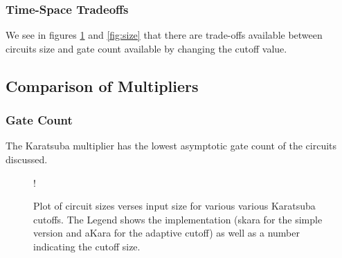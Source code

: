    \subsubsection{Time-Space Tradeoffs}
     We see in figures \ref{fig:cutoff} and \ref{fig:size} that there are trade-offs available between circuits size and gate count available by changing the cutoff value.
  \subsection{Comparison of Multipliers}
    \subsubsection{Gate Count}
      The Karatsuba multiplier has the lowest asymptotic gate count of the circuits discussed.
     \begin{figure}
        \capstart
        \centering
        \resizebox {\textwidth} {!} {
        }
        \caption{Plot of circuit sizes verses input size for various various Karatsuba cutoffs. 
                 The Legend shows the implementation (skara for the simple version and aKara for the adaptive cutoff) as well as a number indicating the cutoff size. }
        \label{fig:cutoff}
      \end{figure}


